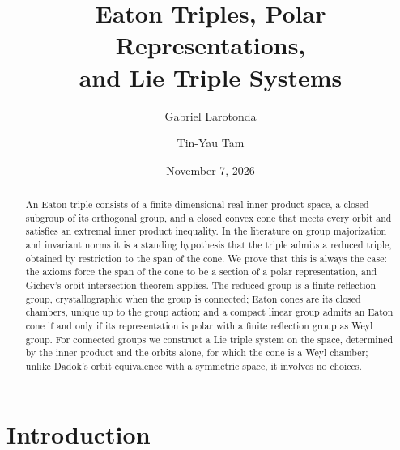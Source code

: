 \documentclass[11pt]{amsart}
\title[Eaton Triples, Polar Representations, and Lie Triple Systems]{Eaton Triples, Polar Representations, \\and Lie Triple Systems}
\author{Gabriel Larotonda}
\author{Tin-Yau Tam}
\date{November 7, 2026}
\theoremstyle{plain}
\theoremstyle{definition}
\theoremstyle{remark}
\begin{document}
\begin{abstract}
An Eaton triple consists of a finite dimensional real inner product space, a closed subgroup of its orthogonal group, and a closed convex cone that meets every orbit and satisfies an extremal inner product inequality. In the literature on group majorization and invariant norms it is a standing hypothesis that the triple admits a reduced triple, obtained by restriction to the span of the cone. We prove that this is always the case: the axioms force the span of the cone to be a section of a polar representation, and Gichev's orbit intersection theorem applies. The reduced group is a finite reflection group, crystallographic when the group is connected; Eaton cones are its closed chambers, unique up to the group action; and a compact linear group admits an Eaton cone if and only if its representation is polar with a finite reflection group as Weyl group. For connected groups we construct a Lie triple system on the space, determined by the inner product and the orbits alone, for which the cone is a Weyl chamber; unlike Dadok's orbit equivalence with a symmetric space, it involves no choices.
\end{abstract}
\maketitle

\section{Introduction}
\end{document}
